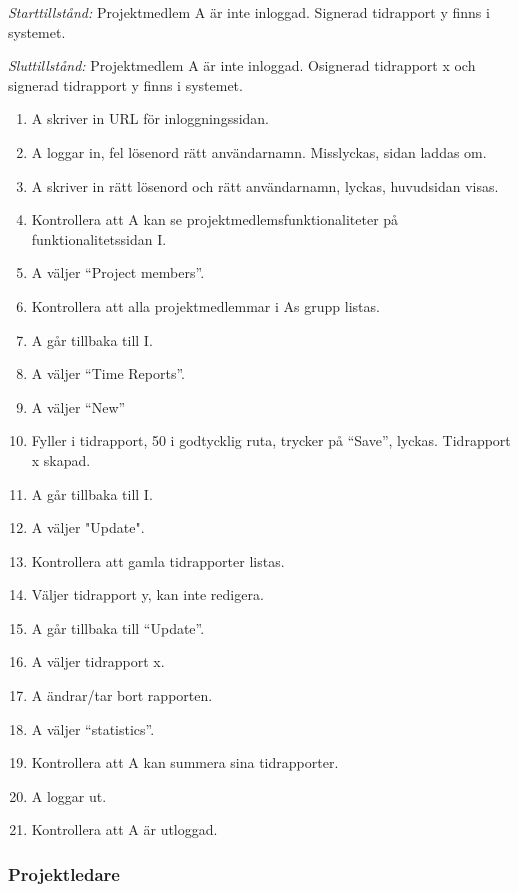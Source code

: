 \documentclass[a4paper]{article}
\begin{document}
\begin{ST}
\emph{Starttillstånd:} Projektmedlem A är inte inloggad. Signerad tidrapport y finns i systemet.

\emph{Sluttillstånd:} Projektmedlem A är inte inloggad. Osignerad tidrapport x och signerad tidrapport y finns i systemet.

\begin{enumerate}

\item A skriver in URL för inloggningssidan.
\item A loggar in, fel lösenord rätt användarnamn. Misslyckas, sidan laddas om.
\item A skriver in rätt lösenord och rätt användarnamn, lyckas, huvudsidan visas.
\item Kontrollera att A kan se projektmedlemsfunktionaliteter på funktionalitetssidan I.
\item A väljer ``Project members''.
\item Kontrollera att alla projektmedlemmar i As grupp listas.
\item A går tillbaka till I.
\item A väljer ``Time Reports''.
\item A väljer ``New''
\item Fyller i tidrapport, 50 i godtycklig ruta, trycker på ``Save'', lyckas. Tidrapport x skapad.
\item A går tillbaka till I.
\item A väljer "Update".
\item Kontrollera att gamla tidrapporter listas.
\item Väljer tidrapport y, kan inte redigera.
\item A går tillbaka till ``Update''.
\item A väljer tidrapport x.
\item A ändrar/tar bort rapporten.
\item A väljer ``statistics''.
\item Kontrollera att A kan summera sina tidrapporter.
\item A loggar ut.
\item Kontrollera att A är utloggad.

\end {enumerate}



\end{ST}

\subsubsection{Projektledare}
\end{document}
